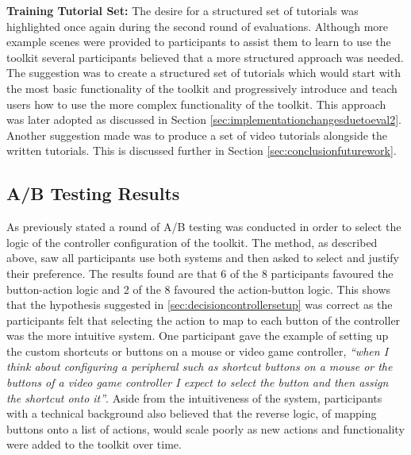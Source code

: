 \documentclass{l4proj}
\begin{document}
\textbf{Training Tutorial Set:} The desire for a structured set of tutorials was highlighted once again during the second round of evaluations. Although more example scenes were provided to participants to assist them to learn to use the toolkit several participants believed that a more structured approach was needed. The suggestion was to create a structured set of tutorials which would start with the most basic functionality of the toolkit and progressively introduce and teach users how to use the more complex functionality of the toolkit. This approach was later adopted as discussed in Section \ref{sec:implementationchangesduetoeval2}. Another suggestion made was to produce a set of video tutorials alongside the written tutorials. This is discussed further in Section \ref{sec:conclusionfuturework}.

\subsection{A/B Testing Results}
\label{sec:evaluationround2ab}
As previously stated a round of A/B testing was conducted in order to select the logic of the controller configuration of the toolkit. The method, as described above, saw all participants use both systems and then asked to select and justify their preference. The results found are that 6 of the 8 participants favoured the button-action logic and 2 of the 8 favoured the action-button logic. This shows that the hypothesis suggested in \ref{sec:decisioncontrollersetup} was correct as the participants felt that selecting the action to map to each button of the controller was the more intuitive system. One participant gave the example of setting up the custom shortcuts or buttons on a mouse or video game controller, \textit{``when I think about configuring a peripheral such as shortcut buttons on a mouse or the buttons of a video game controller I expect to select the button and then assign the shortcut onto it''}. Aside from the intuitiveness of the system, participants with a technical background also believed that the reverse logic, of mapping buttons onto a list of actions, would scale poorly as new actions and functionality were added to the toolkit over time.
\end{document}

